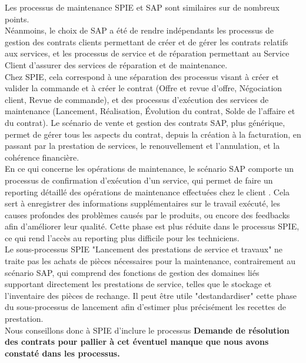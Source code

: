 Les processus de maintenance SPIE et SAP sont similaires sur de nombreux points. \\

Néanmoins, le choix de SAP a été de rendre indépendants les processus de gestion des contrats clients permettant de créer et de gérer les contrats relatifs aux services, et les processus de service et de réparation permettant au Service Client d’assurer des services de réparation et de maintenance. \\

Chez SPIE, cela correspond à une séparation des processus visant à créer et valider la commande et à créer le contrat (Offre et revue d’offre, Négociation client, Revue de commande), et des processus d’exécution des services de maintenance (Lancement, Réalisation, Évolution du contrat, Solde de l’affaire et du contrat). Le scénario de vente et gestion des contrats SAP, plus générique, permet de gérer tous les aspects du contrat, depuis la création à la facturation, en passant par la prestation de services, le renouvellement et l’annulation, et la cohérence financière. \\

En ce qui concerne les opérations de maintenance, le scénario SAP comporte un processus de confirmation d’exécution d’un service, qui permet de faire un reporting détaillé des opérations de maintenance effectuées chez le client . Cela sert à enregistrer des informations supplémentaires sur le travail exécuté, les causes profondes des problèmes causés par le produits, ou encore des feedbacks afin d’améliorer leur qualité. Cette phase est plus réduite dans le processus SPIE, ce qui rend l’accès au reporting plus difficile pour les techniciens. \\

Le sous-processus SPIE "Lancement des prestations de service et travaux" ne traite pas les achats de pièces nécessaires pour la maintenance, contrairement au scénario SAP, qui comprend des fonctions de gestion des domaines liés supportant directement les prestations de service, telles que le stockage et l’inventaire des pièces de rechange. Il peut être utile "destandardiser" cette phase du sous-processus de lancement afin d’estimer plus précisément les recettes de prestation. \\

Nous conseillons donc à SPIE d’inclure le processus \bf{Demande de résolution des contrats} pour pallier à cet éventuel manque que nous avons constaté dans les processus. \\

